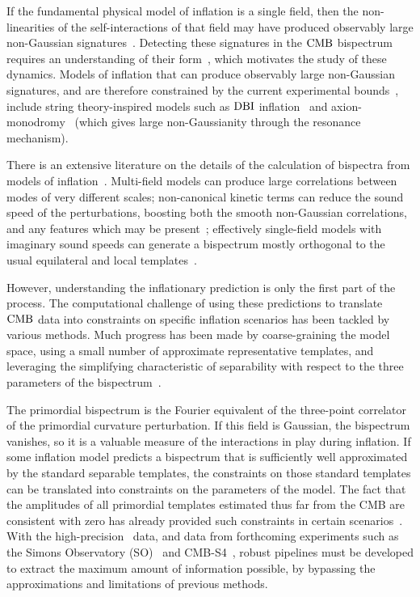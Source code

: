 If the fundamental physical model of inflation is a single field,
then the non-linearities of the self-interactions of that field may have
produced observably large non-Gaussian signatures~\cite{Tolley_2010, achucarro_eft}.
Detecting these signatures in the $\text{CMB}$ bispectrum requires an understanding
of their form~\cite{Komatsu_2005}, which motivates the study of these dynamics.
Models of inflation that can produce observably large non-Gaussian signatures,
and are therefore constrained by the current experimental bounds~\cite{Planck_NG_2018},
include string theory-inspired models such as $\text{DBI}$ inflation~\cite{dbi_silverstein}
and axion-monodromy~\cite{axion_monodr_review_09, Flauger_2014}
(which gives large non-Gaussianity through the resonance mechanism).


There is an extensive literature on the details of the calculation
of bispectra from models of inflation~\cite{chen_easther_lim_1,chen_easther_lim_2,chen_ng_0605,seery_ng_0503,px_burrage,adshead,flauger_pajer_resonant,features_bartolo,bdy_passaglia}.
Multi-field models can produce large
correlations between modes of very different scales;
non-canonical kinetic terms can reduce the sound speed of the perturbations,
boosting both the smooth non-Gaussian correlations, and any
features which may be present~\cite{dbi_adshead,dbi_in_the_sky,warp_features_dbi,dbi_silverstein,dbi_step_miranda,chen_folded_resonant,osc_avila};
effectively single-field models with imaginary sound speeds can generate a bispectrum
mostly orthogonal to the usual equilateral and local templates~\cite{RP_1}.


However, understanding the inflationary prediction is only the first part of the process.
The computational challenge of using these predictions to translate
$\text{CMB}$ data into constraints on specific inflation scenarios has been tackled by
various methods.
Much progress has been made by coarse-graining
the model space, using a small number of approximate representative templates,
and leveraging the simplifying characteristic of separability
with respect to the three parameters of the bispectrum~\cite{Komatsu_2005, Munchmeyer_2014}.


The primordial bispectrum is the Fourier equivalent of the
three-point correlator of the primordial curvature perturbation.
If this field is Gaussian, the bispectrum vanishes, so
it is a valuable measure of the interactions in play during inflation.
If some inflation model predicts a bispectrum that is sufficiently well approximated by
the standard separable templates, the constraints on those standard templates
can be translated into constraints on the parameters of the model.
The fact that the amplitudes of all primordial templates estimated thus far from the CMB
are consistent with zero has already provided such constraints
in certain scenarios~\cite{Planck_NG_2015, Planck_NG_2018}.
With the high-precision \planck~data, and data from forthcoming experiments
such as the Simons Observatory (SO)~\cite{simons}
and CMB-S4~\cite{abazajian2016cmbs4}, robust pipelines must be developed to
extract the maximum amount of information possible,
by bypassing the approximations and
limitations of previous methods.


